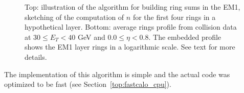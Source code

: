 \begin{figure}[!ht]
\begin{center}
  \caption{\label{fig:building_rings}
  Top: illustration of the \fastcalo algorithm for building ring sums in the EM1, sketching of the computation of $n$ for the first four rings in a hypothetical layer.
  	Bottom: average rings profile from collision data at $30 \leq E_T < 40$ GeV and $0.0 \leq \eta < 0.8$. The embedded profile shows the EM1 layer rings in a logarithmic scale.
  	 See text for more details.
 }
  \end{center}
  \end{figure}











The implementation of this algorithm is simple and the actual code
was optimized to be fast (see Section~\ref{top:fastcalo_cpu}). %


